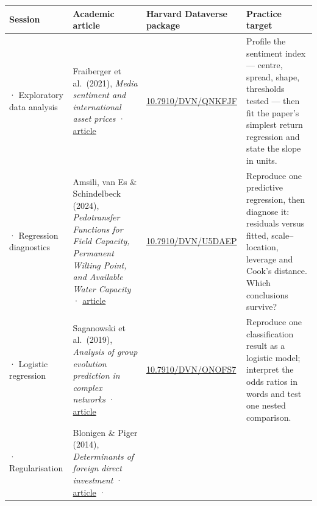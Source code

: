 \documentclass[
  letterpaper,
  10pt,
  twoside,
  openright,
  numbers=noenddot,
  chapterprefix=true]{scrbook}
\begin{document}
\begin{longtable}[]{@{}
  >{\raggedright\arraybackslash}p{}
  >{\raggedright\arraybackslash}p{}
  >{\raggedright\arraybackslash}p{}
  >{\raggedright\arraybackslash}p{}@{}}
\toprule\noalign{}
\begin{minipage}[b]{\linewidth}\raggedright
Session
\end{minipage} & \begin{minipage}[b]{\linewidth}\raggedright
Academic article
\end{minipage} & \begin{minipage}[b]{\linewidth}\raggedright
Harvard Dataverse package
\end{minipage} & \begin{minipage}[b]{\linewidth}\raggedright
Practice target
\end{minipage} \\
\midrule\noalign{}
\endhead
\bottomrule\noalign{}
\endlastfoot
02 · Exploratory data analysis & Fraiberger et al.~(2021), \emph{Media
sentiment and international asset prices} ·
\href{https://doi.org/10.1016/j.jinteco.2021.103526}{article} &
\href{https://doi.org/10.7910/DVN/QNKFJF}{10.7910/DVN/QNKFJF} & Profile
the sentiment index --- centre, spread, shape, thresholds tested ---
then fit the paper's simplest return regression and state the slope in
units. \\
03 · Regression diagnostics & Amsili, van Es \& Schindelbeck (2024),
\emph{Pedotransfer Functions for Field Capacity, Permanent Wilting
Point, and Available Water Capacity} ·
\href{https://doi.org/10.1080/00103624.2024.2336573}{article} &
\href{https://doi.org/10.7910/DVN/U5DAEP}{10.7910/DVN/U5DAEP} &
Reproduce one predictive regression, then diagnose it: residuals versus
fitted, scale--location, leverage and Cook's distance. Which conclusions
survive? \\
04 · Logistic regression & Saganowski et al.~(2019), \emph{Analysis of
group evolution prediction in complex networks} ·
\href{https://doi.org/10.1371/journal.pone.0224194}{article} &
\href{https://doi.org/10.7910/DVN/ONOFS7}{10.7910/DVN/ONOFS7} &
Reproduce one classification result as a logistic model; interpret the
odds ratios in words and test one nested comparison. \\
05 · Regularisation & Blonigen \& Piger (2014), \emph{Determinants of
foreign direct investment} ·
\href{https://doi.org/10.1111/caje.12091}{article} ·

\end{longtable}
\end{document}
